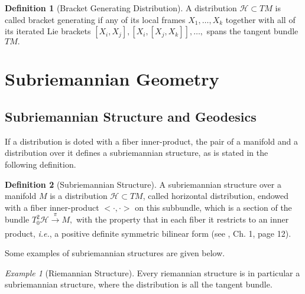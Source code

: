 \documentclass[12pt, letterpaper, reqno]{amsart}
\theoremstyle{definition}
\newtheorem{df}{Definition}
\theoremstyle{plain}
\theoremstyle{remark}
\newtheorem{ex}{Example}
\begin{document}
\begin{df}[Bracket Generating Distribution]
	A distribution $ \mathcal{H}\subset TM $ is called bracket generating if any of its local frames $ X_1,\dots,X_k $ together with all of its iterated Lie brackets $ [X_i,X_j],[X_i,[X_j,X_k]],\dots, $ spans the tangent bundle $ TM. $  
\end{df}
\section{Subriemannian Geometry}%
\label{sec:subriemannian_geometry}

\subsection{Subriemannian Structure and Geodesics}%
\label{sub:subriemannian_structure_and_geodesics}


 If a distribution is doted with a fiber inner-product, the pair of a manifold and a distribution over it defines a subriemannian structure, as is stated in the following definition.
\begin{df}[Subriemannian Structure]
	A subriemannian structure over a manifold $ M $ is a distribution $ \mathcal{H}\subset TM $, called horizontal distribution, endowed with a fiber inner-product $ <\cdot,\cdot> $ on this subbundle, which is a section of the bundle $ T^2_0 \mathcal{H} \xrightarrow[]{\pi} M, $ with the property that in each fiber it restricts to an inner product, \textit{i.e.},  a positive definite symmetric bilinear form (see \cite{hatcher2003vector}, Ch. 1, page 12).
\end{df}

Some examples of subriemannian structures are given below.
\begin{ex}[Riemannian Structure]\label{ex:riem_geo2}
	Every riemannian structure is in particular a subriemannian structure, where the distribution is all the tangent bundle.
\end{ex}
\end{document}
